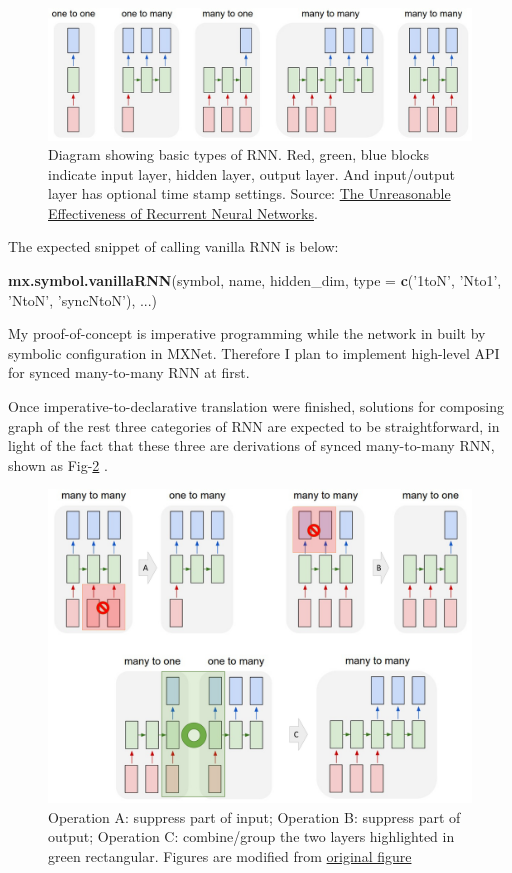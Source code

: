 \documentclass[]{article}
\newenvironment{Shaded}{\begin{snugshade}}{\end{snugshade}}
\newcommand{\KeywordTok}[1]{\textcolor[rgb]{0.13,0.29,0.53}{\textbf{{#1}}}}
\newcommand{\DataTypeTok}[1]{\textcolor[rgb]{0.13,0.29,0.53}{{#1}}}
\newcommand{\StringTok}[1]{\textcolor[rgb]{0.31,0.60,0.02}{{#1}}}
\newcommand{\NormalTok}[1]{{#1}}
\begin{document}
\begin{figure}[ht]
\centering
\includegraphics[width=0.8\linewidth]{diags.jpeg}
\caption{Diagram showing basic types of RNN. Red,
green, blue blocks indicate input layer, hidden layer, output layer. And
input/output layer has optional time stamp settings. Source: \href{http://karpathy.github.io/2015/05/21/rnn-effectiveness/}{The Unreasonable Effectiveness of Recurrent Neural Networks}.}
\label{fig:rnn-types}
\end{figure}

The expected snippet of calling vanilla RNN is below:

\begin{Shaded}
\begin{Highlighting}[]
\KeywordTok{mx.symbol.vanillaRNN}\NormalTok{(symbol, name, hidden_dim, }\DataTypeTok{type =} \KeywordTok{c}\NormalTok{(}\StringTok{'1toN'}\NormalTok{, }\StringTok{'Nto1'}\NormalTok{, }\StringTok{'NtoN'}\NormalTok{, }\StringTok{'syncNtoN'}\NormalTok{), ...)}
\end{Highlighting}
\end{Shaded}

My proof-of-concept is imperative programming while the network in built
by symbolic configuration in MXNet. Therefore I plan to implement
high-level API for synced many-to-many RNN at first.

Once imperative-to-declarative translation were finished, solutions for
composing graph of the rest three categories of RNN are expected to be
straightforward, in light of the fact that these three are derivations
of synced many-to-many RNN, shown as Fig-\ref{fig:rnn-opt} .

\begin{figure}[ht]
\centering
\includegraphics[width=0.7\linewidth]{rnn-models.png}
\caption{Operation A: suppress part of input; Operation B: suppress part of output; Operation C: combine/group the two layers highlighted in green rectangular. Figures are modified from \href{http://karpathy.github.io/2015/05/21/rnn-effectiveness/}{original figure}}
\label{fig:rnn-opt}
\end{figure}
\end{document}
